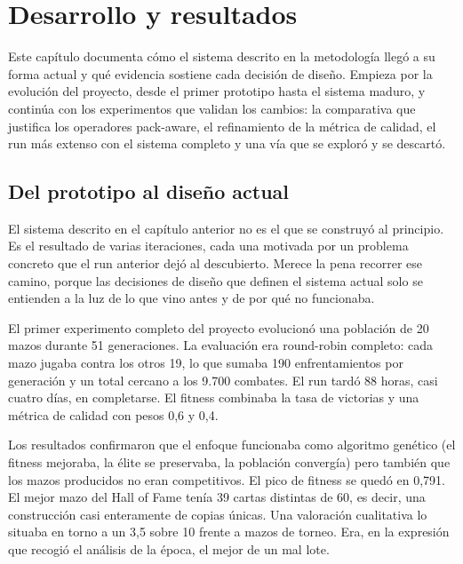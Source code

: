 
\chapter{Desarrollo y resultados}
\label{cap:desarrollo}

Este capítulo documenta cómo el sistema descrito en la metodología llegó a su forma actual y qué evidencia sostiene cada decisión de diseño. Empieza por la evolución del proyecto, desde el primer prototipo hasta el sistema maduro, y continúa con los experimentos que validan los cambios: la comparativa que justifica los operadores pack-aware, el refinamiento de la métrica de calidad, el run más extenso con el sistema completo y una vía que se exploró y se descartó.

\section{Del prototipo al diseño actual}
\label{sec:evolucion}

El sistema descrito en el capítulo anterior no es el que se construyó al principio. Es el resultado de varias iteraciones, cada una motivada por un problema concreto que el run anterior dejó al descubierto. Merece la pena recorrer ese camino, porque las decisiones de diseño que definen el sistema actual solo se entienden a la luz de lo que vino antes y de por qué no funcionaba.

El primer experimento completo del proyecto evolucionó una población de 20 mazos durante 51 generaciones. La evaluación era round-robin completo: cada mazo jugaba contra los otros 19, lo que sumaba 190 enfrentamientos por generación y un total cercano a los 9.700 combates. El run tardó 88 horas, casi cuatro días, en completarse. El fitness combinaba la tasa de victorias y una métrica de calidad con pesos 0,6 y 0,4.

Los resultados confirmaron que el enfoque funcionaba como algoritmo genético (el fitness mejoraba, la élite se preservaba, la población convergía) pero también que los mazos producidos no eran competitivos. El pico de fitness se quedó en 0,791. El mejor mazo del Hall of Fame tenía 39 cartas distintas de 60, es decir, una construcción casi enteramente de copias únicas. Una valoración cualitativa lo situaba en torno a un 3,5 sobre 10 frente a mazos de torneo. Era, en la expresión que recogió el análisis de la época, el mejor de un mal lote.


